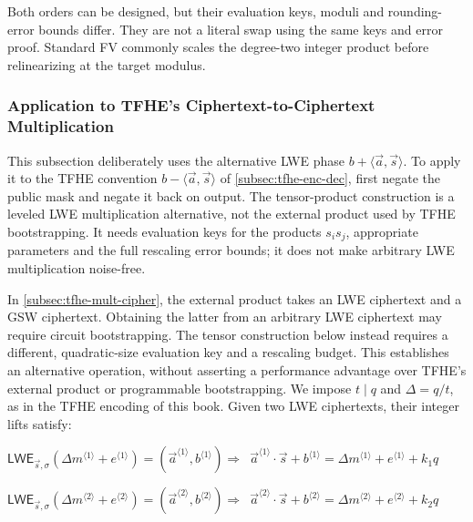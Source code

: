  Both orders can be designed, but their evaluation keys, moduli and rounding-error bounds differ. They are not a literal swap using the same keys and error proof. Standard FV commonly scales the degree-two integer product before relinearizing at the target modulus.



\subsubsection{Application to TFHE's Ciphertext-to-Ciphertext Multiplication}
\label{subsubsec:bfv-mult-cipher-tfhe}

This subsection deliberately uses the alternative LWE phase $b+\langle\vec a,\vec s\rangle$. To apply it to the TFHE convention $b-\langle\vec a,\vec s\rangle$ of \autoref{subsec:tfhe-enc-dec}, first negate the public mask and negate it back on output. The tensor-product construction is a leveled LWE multiplication alternative, not the external product used by TFHE bootstrapping. It needs evaluation keys for the products $s_i s_j$, appropriate parameters and the full rescaling error bounds; it does not make arbitrary LWE multiplication noise-free.


In \autoref{subsec:tfhe-mult-cipher}, the external product takes an LWE ciphertext and a GSW ciphertext. Obtaining the latter from an arbitrary LWE ciphertext may require circuit bootstrapping. The tensor construction below instead requires a different, quadratic-size evaluation key and a rescaling budget. This establishes an alternative operation, without asserting a performance advantage over TFHE's external product or programmable bootstrapping. We impose $t\mid q$ and $\Delta=q/t$, as in the TFHE encoding of this book. Given two LWE ciphertexts, their integer lifts satisfy:

$\textsf{LWE}_{\vec{s}, \sigma}(\Delta m^{\langle 1 \rangle} + e^{\langle 1 \rangle}) = (\vec{a}^{\langle 1 \rangle}, b^{\langle 1 \rangle }) \Rightarrow \,\,\, \vec{a}^{\langle 1 \rangle} \cdot \vec{s} + b^{\langle 1 \rangle} = \Delta m^{\langle 1 \rangle} + e^{\langle 1 \rangle} + k_1q$

$\textsf{LWE}_{\vec{s}, \sigma}(\Delta m^{\langle 2 \rangle} + e^{\langle 2 \rangle})  = (\vec{a}^{\langle 2 \rangle}, b^{\langle 2 \rangle}) \Rightarrow \,\,\, \vec{a}^{\langle 2 \rangle} \cdot \vec{s} + b^{\langle 2 \rangle} = \Delta m^{\langle 2 \rangle} + e^{\langle 2 \rangle} + k_2q$

